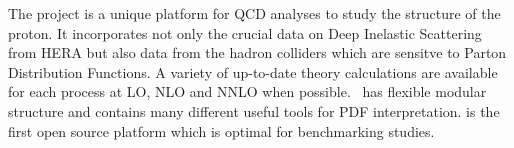 
The \fitter project is a unique platform for QCD analyses to study the 
structure of the proton. It incorporates not only the crucial data on
Deep Inelastic Scattering from HERA but also data from the hadron colliders 
which are sensitve to Parton Distribution Functions. A variety of up-to-date 
theory calculations are available for each process at LO, NLO and NNLO 
when possible.  
\fitter\ has flexible modular structure and contains many different useful tools for PDF interpretation. 
\fitter is the first open source platform which is optimal for benchmarking studies.

